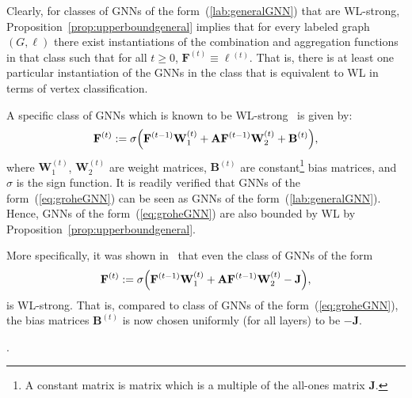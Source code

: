 Clearly, for classes of GNNs of the form~(\ref{lab:generalGNN}) that are WL-strong, 
Proposition~\ref{prop:upperboundgeneral} implies that for every labeled graph $(G,\pmb{\ell})$ there
exist instantiations of the combination and aggregation functions in that class such that
for all $t\geq 0$, $\mathbf{F}^{(t)}\equiv \pmb{\ell}{}^{(t)}$. That is, there is at least one particular instantiation of the GNNs in the class that is equivalent to WL in terms of vertex classification.

A specific class of GNNs which is known to be WL-strong~\cite{grohewl} is given by:
\begin{equation}
\mathbf{F}^{(t)}:=\sigma\Bigl(\mathbf{F}^{(t-1)}\mathbf{W}_1^{(t)}+ \mathbf{A}\mathbf{F}^{(t-1)}\mathbf{W}_2^{(t)} + \mathbf{B}^{(t)}\Bigr), \label{eq:groheGNN}
\end{equation}
where $\mathbf{W}_1^{(t)}$, $\mathbf{W}_2^{(t)}$  are weight matrices, $\mathbf{B}^{(t)}$ are 
constant\footnote{A constant matrix is matrix which is a multiple of the all-ones matrix $\mathbf{J}$.} bias matrices, and $\sigma$ is the sign function. It is readily verified that GNNs of the form~(\ref{eq:groheGNN}) can be seen as  GNNs of the form~(\ref{lab:generalGNN}). Hence, GNNs of the form~(\ref{eq:groheGNN}) are also bounded by WL by Proposition~\ref{prop:upperboundgeneral}.

More specifically, it was shown in~\cite{grohewl} that even the class of GNNs of the form
\begin{equation}
\mathbf{F}^{(t)}:=\sigma\Bigl(\mathbf{F}^{(t-1)}\mathbf{W}_1^{(t)}+ \mathbf{A}\mathbf{F}^{(t-1)}\mathbf{W}_2^{(t)} - \mathbf{J}\Bigr), \label{eq:groheGNNwithJ}
\end{equation}
is WL-strong. That is, compared to class of GNNs of the form~(\ref{eq:groheGNN}), the bias matrices $\mathbf{B}^{(t)}$ is now chosen uniformly (for all layers) to be $-\mathbf{J}$.


.

